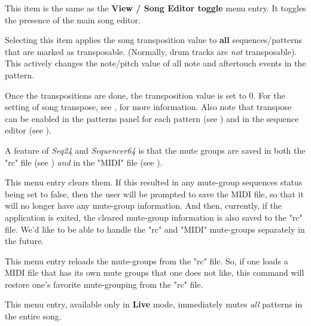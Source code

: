    This item is the same as the 
   \textbf{View / Song Editor toggle} menu entry.  It toggles the presence of
   the main song editor.


   Selecting this item applies the song transposition value to
   \textbf{all} sequences/patterns that are marked as transposable.
   (Normally, drum tracks are \textsl{not} transposable).
   This actively changes the note/pitch value of all note and aftertouch events
   in the pattern.

   Once the transpositions are done, the transposition value is set to 0.
   For the setting of song transpose, see
   , for more information.
   Also note that transpose can be enabled in the patterns panel for each
   pattern (see ) and
   in the sequence editor
   (see ).


   A feature of \textsl{Seq24} and \textsl{Sequencer64} is that the mute groups
   are saved in both the "rc" file
   (see )
   \textsl{and} in the "MIDI" file
   (see ).

   This menu entry clears them. If this resulted in any mute-group sequences
   status being set to false, then the user will be prompted to save the MIDI
   file, so that it will no longer have any
   mute-group information.  And then, currently, if the
   application is exited, the cleared mute-group information is also saved to
   the "rc" file.  We'd like to be able to handle the "rc" and "MIDI"
   mute-groups separately in the future.


   This menu entry reloads the mute-groups from the "rc" file.
   So, if one loads a MIDI file that has its own mute groups that one does not
   like, this command will restore one's favorite mute-grouping from the "rc"
   file.


   This menu entry, available only in \textbf{Live} mode,
   immediately mutes \textsl{all} patterns in the entire song.

